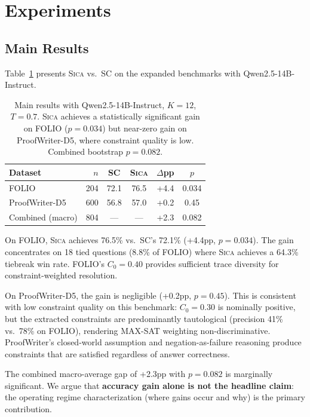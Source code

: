 \documentclass[11pt,a4paper]{article}
\newcommand{\sica}{\textsc{Sica}}
\begin{document}
\section{Experiments}
\label{sec:experiments}

\subsection{Main Results}
\label{sec:main_results}

Table~\ref{tab:main} presents \sica{} vs.\ SC on the expanded benchmarks with Qwen2.5-14B-Instruct.

\begin{table}[t]
\centering
\small
\begin{tabular}{lrcccc}
\toprule
\textbf{Dataset} & \textbf{$n$} & \textbf{SC} & \textbf{\sica{}} & \textbf{$\Delta$pp} & \textbf{$p$} \\
\midrule
FOLIO & 204 & 72.1 & 76.5 & +4.4 & 0.034 \\
ProofWriter-D5 & 600 & 56.8 & 57.0 & +0.2 & 0.45 \\
\midrule
Combined (macro) & 804 & --- & --- & +2.3 & 0.082 \\
\bottomrule
\end{tabular}
\caption{Main results with Qwen2.5-14B-Instruct, $K{=}12$, $T{=}0.7$. \sica{} achieves a statistically significant gain on FOLIO ($p{=}0.034$) but near-zero gain on ProofWriter-D5, where constraint quality is low. Combined bootstrap $p{=}0.082$.}
\label{tab:main}
\end{table}

On FOLIO, \sica{} achieves 76.5\% vs.\ SC's 72.1\% (+4.4pp, $p{=}0.034$).
The gain concentrates on 18 tied questions (8.8\% of FOLIO) where \sica{} achieves a 64.3\% tiebreak win rate.
FOLIO's $C_0 = 0.40$ provides sufficient trace diversity for constraint-weighted resolution.

On ProofWriter-D5, the gain is negligible (+0.2pp, $p{=}0.45$).
This is consistent with low constraint quality on this benchmark: $C_0 = 0.30$ is nominally positive, but the extracted constraints are predominantly tautological (precision 41\% vs.\ 78\% on FOLIO), rendering MAX-SAT weighting non-discriminative.
ProofWriter's closed-world assumption and negation-as-failure reasoning produce constraints that are satisfied regardless of answer correctness.

The combined macro-average gap of +2.3pp with $p{=}0.082$ is marginally significant.
We argue that \textbf{accuracy gain alone is not the headline claim}: the operating regime characterization (where gains occur and why) is the primary contribution.
\end{document}

